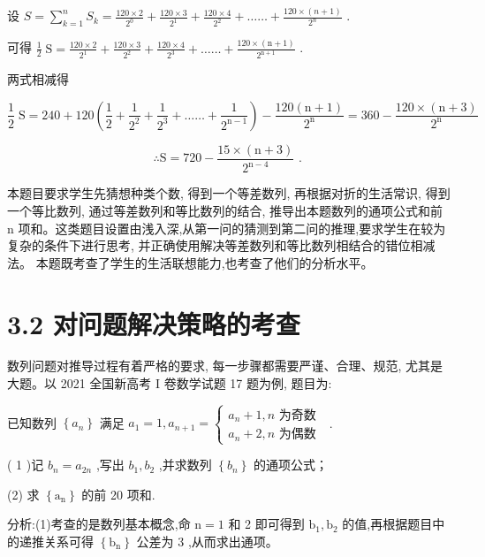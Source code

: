 \documentclass[10pt]{article}
\begin{document}
设 \(S = \mathop{\sum }\limits_{{k = 1}}^{n}{S}_{k} = \frac{{120} \times  2}{{2}^{0}} + \frac{{120} \times  3}{{2}^{1}} + \frac{{120} \times  4}{{2}^{2}} + \ldots \ldots  + \frac{{120} \times  \left( {n + 1}\right) }{{2}^{n}}\) .

可得 \(\frac{1}{2}\mathrm{\;S} = \frac{{120} \times  2}{{2}^{1}} + \frac{{120} \times  3}{{2}^{2}} + \frac{{120} \times  4}{{2}^{3}} + \ldots \ldots  + \frac{{120} \times  \left( {\mathrm{n} + 1}\right) }{{2}^{\mathrm{n} + 1}}\) .

两式相减得

\[
\frac{1}{2}\mathrm{\;S} = {240} + {120}\left( {\frac{1}{2} + \frac{1}{{2}^{2}} + \frac{1}{{2}^{3}} + \ldots \ldots  + \frac{1}{{2}^{\mathrm{n} - 1}}}\right)  - \frac{{120}\left( {\mathrm{n} + 1}\right) }{{2}^{\mathrm{n}}} = {360} - \frac{{120} \times  \left( {\mathrm{n} + 3}\right) }{{2}^{\mathrm{n}}}
\]

\[
\therefore \mathrm{S} = {720} - \frac{{15} \times  \left( {\mathrm{n} + 3}\right) }{{2}^{\mathrm{n} - 4}}\text{ . }
\]

本题目要求学生先猜想种类个数, 得到一个等差数列, 再根据对折的生活常识, 得到一个等比数列, 通过等差数列和等比数列的结合, 推导出本题数列的通项公式和前 \(\mathrm{n}\) 项和。这类题目设置由浅入深,从第一问的猜测到第二问的推理,要求学生在较为复杂的条件下进行思考, 并正确使用解决等差数列和等比数列相结合的错位相减法。 本题既考查了学生的生活联想能力,也考查了他们的分析水平。

\section*{3.2 对问题解决策略的考查}

数列问题对推导过程有着严格的要求, 每一步骤都需要严谨、合理、规范, 尤其是大题。以 2021 全国新高考 I 卷数学试题 17 题为例, 题目为:

已知数列 \(\left\{  {a}_{n}\right\}\) 满足 \({a}_{1} = 1,{a}_{n + 1} = \left\{  \begin{array}{l} {a}_{n} + 1,n\text{ 为奇数 } \\  {a}_{n} + 2,n\text{ 为偶数 } \end{array}\right.\) .

( 1 )记 \({b}_{n} = {a}_{2n}\) ,写出 \({b}_{1},{b}_{2}\) ,并求数列 \(\left\{  {b}_{n}\right\}\) 的通项公式；

(2) 求 \(\left\{  {\mathrm{a}}_{\mathrm{n}}\right\}\) 的前 20 项和.

分析:(1)考查的是数列基本概念,命 \(\mathrm{n} = 1\) 和 2 即可得到 \({\mathrm{b}}_{1},{\mathrm{b}}_{2}\) 的值,再根据题目中的递推关系可得 \(\left\{  {\mathrm{b}}_{\mathrm{n}}\right\}\) 公差为 3 ,从而求出通项。
\end{document}
